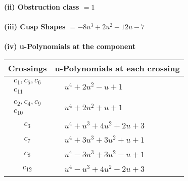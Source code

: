 \documentclass[1p]{elsarticle_modified}
\theoremstyle{definition}
\begin{document}
\flushleft \textbf{(ii) Obstruction class $= 1$}\\~\\
\flushleft \textbf{(iii) Cusp Shapes $= -8 u^3+2 u^2-12 u-7$}\\~\\
\newpage\renewcommand{\arraystretch}{1}
\flushleft \textbf{(iv) u-Polynomials at the component}\newline \\
\begin{tabular}{m{50pt}|m{274pt}}
Crossings & \hspace{64pt}u-Polynomials at each crossing \\
\hline $$\begin{aligned}c_{1},c_{5},c_{6}\\c_{11}\end{aligned}$$&$\begin{aligned}
&u^4+2 u^2- u+1
\end{aligned}$\\
\hline $$\begin{aligned}c_{2},c_{4},c_{9}\\c_{10}\end{aligned}$$&$\begin{aligned}
&u^4+2 u^2+u+1
\end{aligned}$\\
\hline $$\begin{aligned}c_{3}\end{aligned}$$&$\begin{aligned}
&u^4+u^3+4 u^2+2 u+3
\end{aligned}$\\
\hline $$\begin{aligned}c_{7}\end{aligned}$$&$\begin{aligned}
&u^4+3 u^3+3 u^2+u+1
\end{aligned}$\\
\hline $$\begin{aligned}c_{8}\end{aligned}$$&$\begin{aligned}
&u^4-3 u^3+3 u^2- u+1
\end{aligned}$\\
\hline $$\begin{aligned}c_{12}\end{aligned}$$&$\begin{aligned}
&u^4- u^3+4 u^2-2 u+3
\end{aligned}$\\
\hline
\end{tabular}\\~\\
\end{document}

